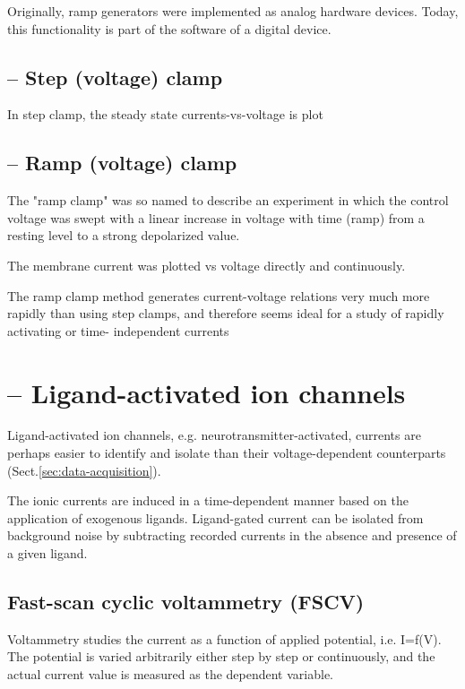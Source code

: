 Originally, ramp generators were implemented as analog hardware devices. Today,
this functionality is part of the software of a digital device.
\subsection{-- Step (voltage) clamp}
\label{sec:step-clamp}

In step clamp, the  steady state currents-vs-voltage is plot

\subsection{-- Ramp (voltage) clamp}
\label{sec:ramp-clamp}

The "ramp clamp" was so named to describe an experiment in which the control
voltage was swept with a linear increase in voltage with time (ramp) from a
resting level to a strong depolarized value.


The membrane current was plotted vs voltage directly and continuously.

The ramp clamp method generates current-voltage relations very much more rapidly than
using step clamps, and therefore seems ideal for a study of rapidly activating or time-
independent currents




\section{-- Ligand-activated ion channels}
\label{sec:measure-current-Ligand-activated-channels}

Ligand-activated ion channels, e.g. neurotransmitter-activated, currents are
perhaps easier to identify and isolate than their voltage-dependent counterparts
(Sect.\ref{sec:data-acquisition}).

The ionic currents are induced in a time-dependent manner based on the
application of exogenous ligands.
Ligand-gated current can be isolated from background noise by subtracting
recorded currents in the absence and presence of a given ligand.

\subsection{Fast-scan cyclic voltammetry (FSCV)}
\label{sec:FSCV}

Voltammetry studies the current as a function of applied potential, i.e. I=f(V).
The potential is varied arbitrarily either step by step or continuously, and the
actual current value is measured as the dependent variable.

